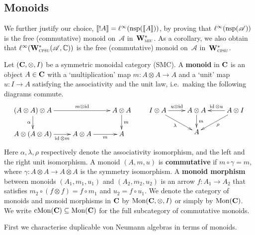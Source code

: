 \documentclass[a]{subfiles}
\begin{document}
\subsection{Monoids}
\label{sec:monoids-in-vna}
\begin{parsec}%
We further justify our choice,
$\llbracket!A\rrbracket = \ell^\infty(\mathrm{nsp}(\llbracket A\rrbracket))$,
by proving that $\ell^\infty(\mathrm{nsp}(\mathscr{A}))$
is the free (commutative) monoid on~$\mathscr{A}$ in~$\mathbf{W}^*_{\text{\textsc{miu}}}$.
As a corollary, we also obtain that $\ell^\infty(\mathbf{W}^*_{\text{\textsc{cpsu}}}(\mathscr{A},\mathbb{C}))$
is the free (commutative) monoid on~$\mathscr{A}$
in~$\mathbf{W}^*_{\text{\textsc{cpsu}}}$.


Let $(\mathbf{C},\otimes,I)$ be a symmetric monoidal category (SMC).
A \textbf{monoid} in $\mathbf{C}$ is an object $A\in\mathbf{C}$ with
a `multiplication' map
$m\colon A\otimes A\to A$
and a `unit' map $u\colon I\to A$
satisfying the associativity and the unit law,
i.e.\ making the following diagrams commute.
\[
\xymatrix@R-.5pc{
(A\otimes A)\otimes A
\ar[d]_{\alpha}
\ar[rr]^-{m\otimes \id}
&&
A\otimes A
\ar[d]^{m}
\\
A\otimes (A\otimes A)
\ar[r]_-{\id\otimes m}
&
A\otimes A
\ar[r]_-{m}
&
A
}
\qquad
\xymatrix@R-.5pc{
I\otimes A
\ar[dr]_{\lambda}
\ar[r]^-{u\otimes \id}
&
A\otimes A
\ar[d]^{m}
&
\ar[l]_-{\id\otimes u}
A\otimes I
\ar[dl]^{\rho}
\\
&
A
&
}
\]
Here $\alpha,\lambda,\rho$ respectively
denote the associativity isomorphism, and
the left and the right unit isomorphism.
A monoid $(A,m,u)$ is \textbf{commutative} if
$m\circ \gamma=m$,
where $\gamma\colon A\otimes A\to A\otimes A$ is the symmetry isomorphism.
A \textbf{monoid morphism} between monoids $(A_1,m_1,u_1)$
and $(A_2,m_2,u_2)$ is an arrow $f\colon A_1\to A_2$
that satisfies $m_2\circ (f\otimes f)=f \circ m_1$
and $u_2=f \circ u_1$.
We denote the category of monoids
and monoid morphisms in $\mathbf{C}$
by $\mathrm{Mon}(\mathbf{C},\otimes,I)$ or simply by $\mathrm{Mon}(\mathbf{C})$.
We write $\mathrm{cMon}(\mathbf{C})\subseteq\mathrm{Mon}(\mathbf{C})$ for
the full subcategory of commutative monoids.


First we characterise duplicable von Neumann algebras
in terms of monoids.


\end{parsec}
\end{document}
